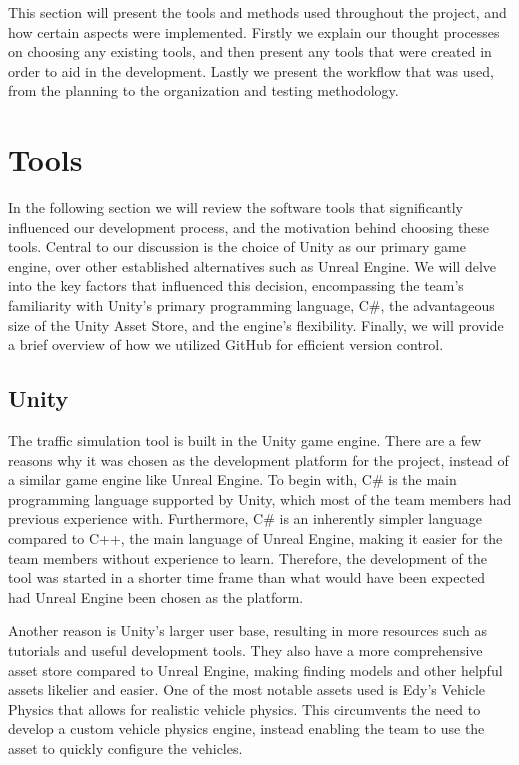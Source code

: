 This section will present the tools and methods used throughout the project, and how certain aspects were implemented. Firstly we explain our thought processes on choosing any existing tools, and then present any tools that were created in order to aid in the development. Lastly we present the workflow that was used, from the planning to the organization and testing methodology.
\section{Tools}
    In the following section we will review the software tools that significantly influenced our development process, and the motivation behind choosing these tools. Central to our discussion is the choice of Unity as our primary game engine, over other established alternatives such as Unreal Engine. We will delve into the key factors that influenced this decision, encompassing the team's familiarity with Unity's primary programming language, C\#, the advantageous size of the Unity Asset Store, and the engine's flexibility. Finally, we will provide a brief overview of how we utilized GitHub for efficient version control.

    \subsection{Unity}
        The traffic simulation tool is built in the Unity game engine. There are a few reasons why it was chosen as the development platform for the project, instead of a similar game engine like Unreal Engine. To begin with, C\# is the main programming language supported by Unity, which most of the team members had previous experience with. Furthermore, C\# is an inherently simpler language compared to C++, the main language of Unreal Engine, making it easier for the team members without experience to learn. Therefore, the development of the tool was started in a shorter time frame than what would have been expected had Unreal Engine been chosen as the platform.

        Another reason is Unity's larger user base, resulting in more resources such as tutorials and useful development tools. They also have a more comprehensive asset store compared to Unreal Engine, making finding models and other helpful assets likelier and easier. One of the most notable assets used is Edy's Vehicle Physics that allows for realistic vehicle physics\cite{edy}. This circumvents the need to develop a custom vehicle physics engine, instead enabling the team to use the asset to quickly configure the vehicles.

